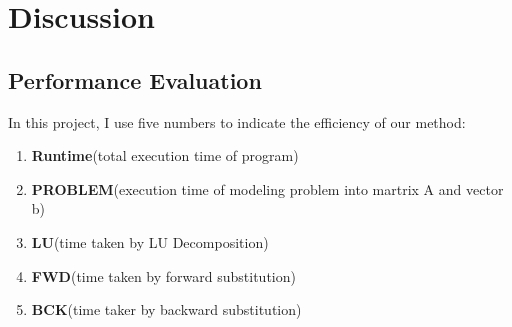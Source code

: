 \documentclass{article}
\begin{document}
\section{Discussion}
\subsection{Performance Evaluation}
In this project, I use five numbers to indicate the efficiency of our method:
\begin{enumerate}
    \item \textbf{Runtime}(total execution time of program)
    \item \textbf{PROBLEM}(execution time of modeling problem into martrix A and vector b)
    \item \textbf{LU}(time taken by LU Decomposition)
    \item \textbf{FWD}(time taken by forward substitution)
    \item \textbf{BCK}(time taker by backward substitution)
\end{enumerate}
\end{document}
